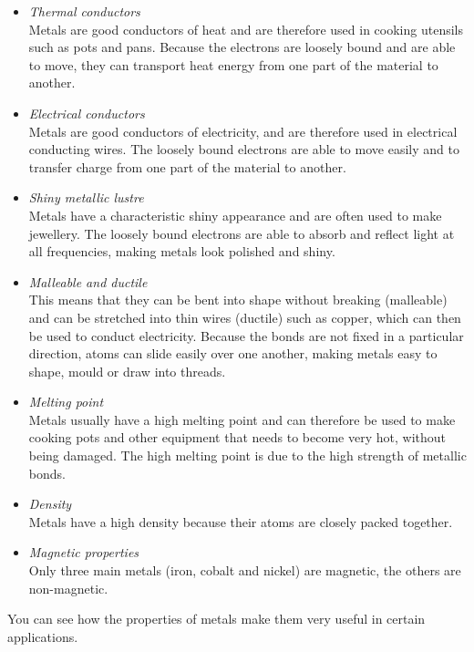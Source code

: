         \label{m38708*id65732}\begin{itemize}[noitemsep]
            \label{m38708*uid77}\item \textsl{Thermal conductors} \\
Metals are good conductors of heat and are therefore used in cooking utensils such as pots and pans. Because the electrons are loosely bound and are able to move, they can transport heat energy from one part of the material to another.
\label{m38708*uid78}\item \textsl{Electrical conductors} \\
Metals are good conductors of electricity, and are therefore used in electrical conducting wires. The loosely bound electrons are able to move easily and to transfer charge from one part of the material to another.
\label{m38708*uid79}\item \textsl{Shiny metallic lustre} \\
Metals have a characteristic shiny appearance and are often used to make jewellery. The loosely bound electrons are able to absorb and reflect light at all frequencies, making metals look polished and shiny.
\label{m38708*uid80}\item \textsl{Malleable and ductile} \\
This means that they can be bent into shape without breaking (malleable) and can be stretched into thin wires (ductile) such as copper, which can then be used to conduct electricity. Because the bonds are not fixed in a particular direction, atoms can slide easily over one another, making metals easy to shape, mould or draw into threads.
\label{m38708*uid81}\item \textsl{Melting point} \\
Metals usually have a high melting point and can therefore be used to make cooking pots and other equipment that needs to become very hot, without being damaged. The high melting point is due to the high strength of metallic bonds.
\label{m38708*uid82}\item \textsl{Density} \\
Metals have a high density because their atoms are closely packed together.
\item \textsl{Magnetic properties} \\ 
Only three main metals (iron, cobalt and nickel) are magnetic, the others are non-magnetic.
\end{itemize}
         \label{m38708*id65852}You can see how the properties of metals make them very useful in certain applications.\par 
